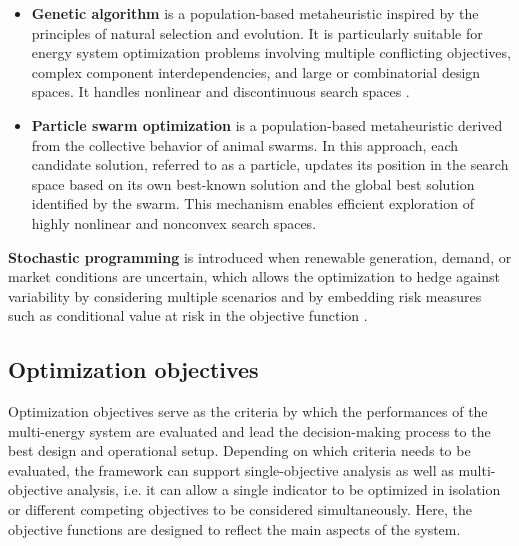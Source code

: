 \documentclass[12pt,a4paper]{report}
\begin{document}
\begin{itemize}
\item \textbf{Genetic algorithm} is a population-based metaheuristic inspired by the principles of natural selection and evolution. It is particularly suitable for energy system optimization problems involving multiple conflicting objectives, complex component interdependencies, and large or combinatorial design spaces. It handles nonlinear and discontinuous search spaces \cite{Mousavi2022MultiobjectiveSO, AghaKassab2024}.

\item \textbf{Particle swarm optimization} is a population-based metaheuristic derived from the collective behavior of animal swarms. In this approach, each candidate solution, referred to as a particle, updates its position in the search space based on its own best-known solution and the global best solution identified by the swarm. This mechanism enables efficient exploration of highly nonlinear and nonconvex search spaces\cite{abbasianhamedani2026minireview}.
\end{itemize}

\textbf{Stochastic programming} is introduced when renewable generation, demand, or market conditions are uncertain, which allows the optimization to hedge against variability by considering multiple scenarios and by embedding risk measures such as conditional value at risk in the objective function \cite{hemmati2019stochastic,Cao2025Secure}.


\subsection{Optimization objectives}
Optimization objectives serve as the criteria by which the performances of the multi-energy system are evaluated and lead the decision-making process to the best design and operational setup. Depending on which criteria needs to be evaluated, the framework can support single-objective analysis as well as multi-objective analysis, i.e. it can allow a single indicator to be optimized in isolation or different competing objectives to be considered simultaneously. Here, the objective functions are designed to reflect the main  aspects of the system.
\end{document}
